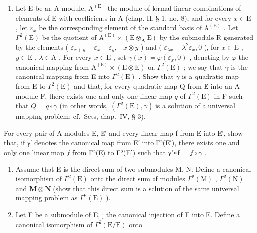 \begin{enumerate}
\def\labelenumi{\alph{enumi})}
\tightlist
\item
  Let E be an A-module, \(\mathrm{A}^{(\mathrm{E})}\) the module of formal linear combinations of elements of E with coefficients in A (chap. II, § 1, no. 8), and for every \(x \in \mathrm{E}\) , let \(\varepsilon_x\) be the corresponding element of the standard basis of \(\mathrm{A}^{(\mathrm{E})}\) . Let \(\Gamma^2(\mathrm{E})\) be the quotient of \(\mathrm{A}^{(\mathrm{E})} \times (\mathrm{E} \otimes_{\mathbf{A}} \mathrm{E})\) by the submodule R generated by the elements ( \(\varepsilon_{x+y} - \varepsilon_x - \varepsilon_y, -x \otimes y\) ) and ( \(\varepsilon_{\lambda x} - \lambda^2\varepsilon_x, 0\) ), for \(x \in \mathrm{E}\) , \(y \in \mathrm{E}\) , \(\lambda \in \mathrm{A}\) . For every \(x \in \mathrm{E}\) , set \(\gamma(x) = \varphi(\varepsilon_x, 0)\) , denoting by \(\varphi\) the canonical mapping from \(\mathrm{A}^{(\mathrm{E})} \times (\mathrm{E} \otimes \mathrm{E})\) on \(\Gamma^2(\mathrm{E})\) ; we say that \(\gamma\) is the canonical mapping from E into \(\Gamma^2(\mathrm{E})\) . Show that \(\gamma\) is a quadratic map from E to \(\Gamma^2(\mathrm{E})\) and that, for every quadratic map Q from E into an A-module F, there exists one and only one linear map \(q\) of \(\Gamma^2(\mathrm{E})\) in F such that \(Q = q \circ \gamma\) (in other words, \((\Gamma^2(\mathrm{E}), \gamma)\) is a solution of a universal mapping problem; cf.~Sets, chap.~IV, § 3).
\end{enumerate}

For every pair of A-modules E, E′ and every linear map f from E into E′, show that, if γ′ denotes the canonical map from E′ into Γ²(E′), there exists one and only one linear map \(\bar{f}\) from Γ²(E) to Γ²(E') such that γ'∘f = \(\bar{f} \circ \gamma\) .

\begin{enumerate}
\def\labelenumi{\alph{enumi})}
\setcounter{enumi}{1}
\item
  Assume that E is the direct sum of two submodules M, N. Define a canonical isomorphism of \(\Gamma^{2}(\mathrm{E})\) onto the direct sum of modules \(\Gamma^{2}(\mathrm{M})\) , \(\Gamma^{2}(\mathrm{N})\) and \(\mathbf{M} \otimes \mathbf{N}\) (show that this direct sum is a solution of the same universal mapping problem as \(\Gamma^{2}(\mathrm{E})\) ).
\item
  Let F be a submodule of E, j the canonical injection of F into E. Define a canonical isomorphism of \(\Gamma^{2}(\mathrm{E}/\mathrm{F})\) onto
\end{enumerate}

